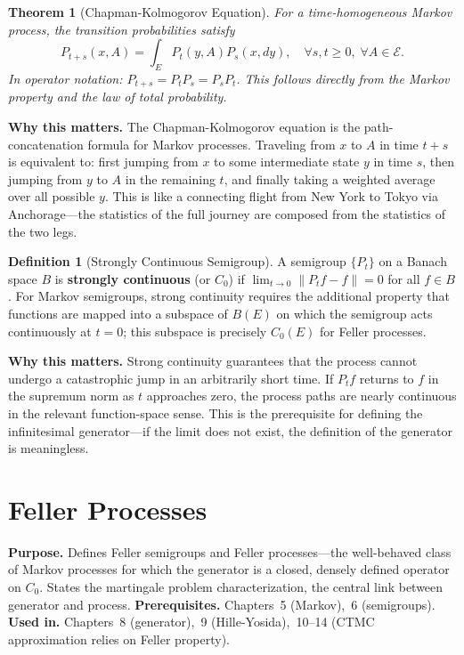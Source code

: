 \documentclass[11pt,a4paper,openany]{book}
\theoremstyle{definition}
\newtheorem{definition}{Definition}[chapter]
\theoremstyle{plain}
\newtheorem{theorem}{Theorem}[chapter]
\theoremstyle{remark}
\newcommand{\1}{\mathbbm{1}}
\newcommand{\calE}{\mathcal{E}}
\begin{document}
\begin{theorem}[Chapman-Kolmogorov Equation]
For a time-homogeneous Markov process, the transition probabilities satisfy
\[
P_{t+s}(x, A) = \int_{E} P_{t}(y, A) P_{s}(x, dy), \quad \forall s,t \geq 0, \; \forall A \in \calE.
\]
In operator notation: $P_{t+s} = P_{t} P_{s} = P_{s} P_{t}$. This follows directly from the Markov property and the law of total probability.
\end{theorem}

\medskip
\noindent\textbf{Why this matters.} The Chapman-Kolmogorov equation is the path-concatenation formula for Markov processes. Traveling from $x$ to $A$ in time $t+s$ is equivalent to: first jumping from $x$ to some intermediate state $y$ in time $s$, then jumping from $y$ to $A$ in the remaining $t$, and finally taking a weighted average over all possible $y$. This is like a connecting flight from New York to Tokyo via Anchorage---the statistics of the full journey are composed from the statistics of the two legs.

\begin{definition}[Strongly Continuous Semigroup]
A semigroup $\{P_{t}\}$ on a Banach space $B$ is \textbf{strongly continuous} (or $C_{0}$) if $\lim_{t \to 0} \|P_{t} f - f\| = 0$ for all $f \in B$. For Markov semigroups, strong continuity requires the additional property that functions are mapped into a subspace of $B(E)$ on which the semigroup acts continuously at $t = 0$; this subspace is precisely $C_{0}(E)$ for Feller processes.
\end{definition}

\medskip
\noindent\textbf{Why this matters.} Strong continuity guarantees that the process cannot undergo a catastrophic jump in an arbitrarily short time. If $P_t f$ returns to $f$ in the supremum norm as $t$ approaches zero, the process paths are nearly continuous in the relevant function-space sense. This is the prerequisite for defining the infinitesimal generator---if the limit does not exist, the definition of the generator is meaningless.

\chapter{Feller Processes}

\noindent\textbf{Purpose.} Defines Feller semigroups and Feller processes---the well-behaved class of Markov processes for which the generator is a closed, densely defined operator on $C_{0}$. States the martingale problem characterization, the central link between generator and process.
\textbf{Prerequisites.} Chapters~5 (Markov),~6 (semigroups).
\textbf{Used in.} Chapters~8 (generator),~9 (Hille-Yosida),~10--14 (CTMC approximation relies on Feller property).
\end{document}
